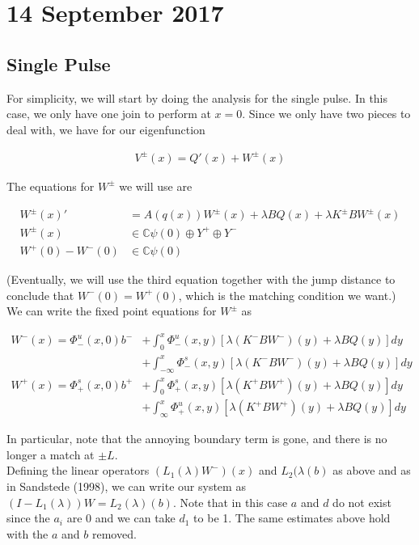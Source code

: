\documentclass[12pt]{article}
\def\C{{\mathbb C}}
\begin{document}
\section*{14 September 2017}

\subsection*{Single Pulse}

For simplicity, we will start by doing the analysis for the single pulse. In this case, we only have one join to perform at $x = 0$. Since we only have two pieces to deal with, we have for our eigenfunction

\begin{align*}
V^\pm(x) = Q'(x) + W^\pm(x)
\end{align*}

The equations for $W^\pm$ we will use are

\begin{align*}
W^\pm(x)' &= A(q(x)) W^\pm(x) + \lambda B Q(x) + \lambda K^\pm B W^\pm(x) \\
W^\pm(x) &\in \C \psi(0) \oplus Y^+ \oplus Y^- \\
W^+(0) - W^-(0) &\in \C \psi(0) 
\end{align*}

(Eventually, we will use the third equation together with the jump distance to conclude that $W^-(0) = W^+(0)$, which is the matching condition we want.)\\

We can write the fixed point equations for $W^\pm$ as

\begin{align*}
W^-(x) = \Phi^u_-(x, 0)b^- &+ \int_0^x \Phi^u_-(x, y)[\lambda (K^- B W^-)(y) + \lambda B Q(y) ] dy \\
&+ \int_{-\infty}^x \Phi^s_-(x, y)[\lambda (K^- B W^-)(y) + \lambda B Q(y) ] dy \\
W^+(x) = \Phi^s_+(x, 0)b^+ &+ \int_0^x \Phi^s_+(x, y)[\lambda (K^+ B W^+)(y) + \lambda B Q(y) ] dy \\
&+ \int_{\infty}^x \Phi^u_+(x, y)[\lambda (K^+ B W^+)(y) + \lambda B Q(y) ] dy
\end{align*}

In particular, note that the annoying boundary term is gone, and there is no longer a match at $\pm L$.\\

Defining the linear operators $(L_1(\lambda)W^-)(x)$ and $L_2(\lambda(b)$ as above and as in Sandstede (1998), we can write our system as $(I - L_1(\lambda))W = L_2(\lambda)(b)$. Note that in this case $a$ and $d$ do not exist since the $a_i$ are 0 and we can take $d_1$ to be 1. The same estimates above hold with the $a$ and $b$ removed.\\
\end{document}
